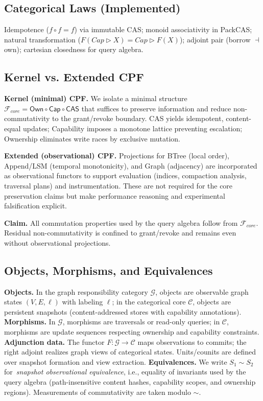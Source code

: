 \documentclass[10pt]{article}
\begin{document}
\subsection{Categorical Laws (Implemented)}
Idempotence ($f\circ f=f$) via immutable CAS; monoid associativity in PackCAS;
natural transformation ($F(Cap\triangleright X)=Cap\triangleright F(X)$);
adjoint pair (borrow $\dashv$ own); cartesian closedness for query algebra.

\subsection{Kernel vs. Extended CPF}
\textbf{Kernel (minimal) CPF.} We isolate a minimal structure
\(\mathcal{F}_{core} = \mathsf{Own} \circ \mathsf{Cap} \circ \mathsf{CAS}\) that suffices to preserve information and reduce non-commutativity to the grant/revoke boundary. CAS yields idempotent, content-equal updates; Capability imposes a monotone lattice preventing escalation; Ownership eliminates write races by exclusive mutation.

\textbf{Extended (observational) CPF.} Projections for BTree (local order), Append/LSM (temporal monotonicity), and Graph (adjacency) are incorporated as observational functors to support evaluation (indices, compaction analysis, traversal plans) and instrumentation. These are not required for the core preservation claims but make performance reasoning and experimental falsification explicit.

\textbf{Claim.} All commutation properties used by the query algebra follow from \(\mathcal{F}_{core}\). Residual non-commutativity is confined to grant/revoke and remains even without observational projections.

\subsection{Objects, Morphisms, and Equivalences}
\textbf{Objects.} In the graph responsibility category $\mathcal{G}$, objects are observable graph states $(V,E,\ell)$ with labeling $\ell$; in the categorical core $\mathcal{C}$, objects are persistent snapshots (content-addressed stores with capability annotations).
\textbf{Morphisms.} In $\mathcal{G}$, morphisms are traversals or read-only queries; in $\mathcal{C}$, morphisms are update sequences respecting ownership and capability constraints.
\textbf{Adjunction data.} The functor $F\!:\mathcal{G}\to\mathcal{C}$ maps observations to commits; the right adjoint realizes graph views of categorical states. Units/counits are defined over snapshot formation and view extraction.
\textbf{Equivalences.} We write $S_1\sim S_2$ for \,\emph{snapshot observational equivalence}, i.e., equality of invariants used by the query algebra (path-insensitive content hashes, capability scopes, and ownership regions). Measurements of commutativity are taken modulo $\sim$.
\end{document}
